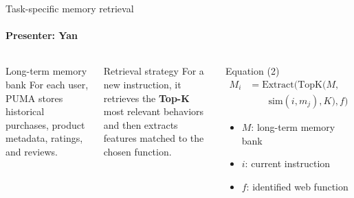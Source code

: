 \documentclass[10pt]{beamer}
\newcommand{\speaker}[1]{\framesubtitle{Presenter: #1}}
\begin{document}
\begin{frame}{Task-specific memory retrieval}
  \speaker{Yan}
  \begin{columns}[T,onlytextwidth]
      \begin{block}{Long-term memory bank}
        \small
        For each user, PUMA stores historical purchases, product metadata, ratings, and reviews.
      \end{block}
      \begin{block}{Retrieval strategy}
        \small
        For a new instruction, it retrieves the \textbf{Top-K} most relevant behaviors and then extracts features matched to the chosen function.
      \end{block}
      \begin{block}{Equation (2)}
        \scriptsize
        \[
          \begin{aligned}
            M_i &= \mathrm{Extract}\!\bigl(\mathrm{TopK}(M, \\
            &\qquad \mathrm{sim}(i,m_j), K), f\bigr)
          \end{aligned}
        \]
        \vspace{-0.7em}
        \begin{itemize}\itemsep0.15em
          \item $M$: long-term memory bank
          \item $i$: current instruction
          \item $f$: identified web function
        \end{itemize}
      \end{block}
  \end{columns}
\end{frame}
\end{document}
